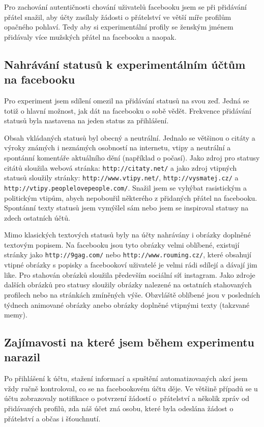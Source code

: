 \documentclass[thesis=M,czech]{FITthesis}[2013/05/10]
\begin{document}
Pro zachování autentičnosti chování uživatelů facebooku jsem se při přidávání přátel snažil, aby účty zasílaly žádosti o přátelství ve větší míře profilům opačného pohlaví. Tedy aby si experimentální profily se ženským jménem přidávaly více mužských přátel na facebooku a naopak. 

\subsection{Nahrávání statusů k experimentálním účtům na facebooku}

Pro experiment jsem sdílení omezil na přidávání statusů na svou zeď. Jedná se totiž o hlavní možnost, jak dát na facebooku o sobě vědět. Frekvence přidávání statusů byla nastavena na jeden status za přihlášení. 

Obsah vkládaných statusů byl obecný a neutrální. Jednalo se většinou o citáty a výroky známých i neznámých osobností na internetu, vtipy a neutrální a spontánní komentáře aktuálního dění (například o počasí). Jako zdroj pro statusy citátů sloužila webová stránka: \verb|http://citaty.net/| a jako zdroj vtipných statusů sloužily stránky: \verb|http://www.vtipy.net/|, \verb|http://vysmatej.cz/| a \verb|http://vtipy.peoplelovepeople.com/|. Snažil jsem se vyhýbat rasistickým a politickým vtipům, abych nepobouřil některého z přidaných přátel na facebooku. Spontánní texty statusů jsem vymýšlel sám nebo jsem se inspiroval statusy na zdech ostatních účtů.

Mimo klasických textových statusů byly na účty nahrávány i obrázky doplněné textovým popisem. Na facebooku jsou tyto obrázky velmi oblíbené, existují stránky jako \verb|http://9gag.com/| nebo \verb|http://www.rouming.cz/|, které obsahují vtipné obrázky s popisky a facebookoví uživatelé je velmi rádi  sdílejí a dávají jim like. Pro stahován obrázků sloužila především sociální síť instagram. Jako zdroje dalších obrázků pro statusy sloužily obrázky nalezené na ostatních stahovaných profilech nebo na stránkách zmíněných výše. Obzvláště oblíbené jsou v posledních týdnech animované obrázky anebo obrázky doplněné vtipnými texty (takzvané memy).

\subsection{Zajímavosti na které jsem během experimentu narazil}

Po přihlášení k účtu, stažení informací a spuštění automatizovaných akcí jsem vždy ručně kontroloval, co se na facebookovém účtu děje. Ve většině případů se u účtu zobrazovaly notifikace o potvrzení žádostí o~přátelství a několik zpráv od přidávaných profilů, zda náš účet zná osobu, které byla odeslána žádost o přátelství a občas i šťouchnutí.
\end{document}

